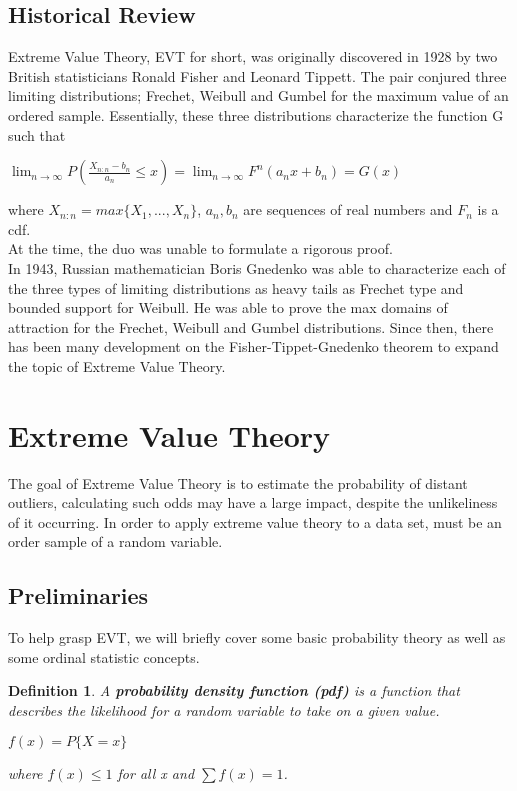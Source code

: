 \documentclass[11pt,a4paper]{article}
\theoremstyle{plain}
\newtheorem{de}[fact]{Definition}
\begin{document}
\subsection{Historical Review}
Extreme Value Theory, EVT for short, was originally discovered in 1928 by two British statisticians Ronald Fisher and Leonard Tippett. The pair conjured three limiting distributions; Frechet, Weibull and Gumbel for the maximum value of an ordered sample. Essentially, these three distributions characterize the function G such that 
\begin{center}
$\lim_{n\rightarrow \infty}P(\frac{X_{n:n}-b_n}{a_n}\leq x)=\lim_{n\rightarrow \infty}F^n(a_nx+b_n)=G(x)$
\end{center}
where $X_{n:n}=max\{X_1,...,X_n \}$, $a_n,b_n$ are sequences of real numbers and $F_n$ is a cdf.
\\
At the time, the duo was unable to formulate a rigorous proof. 
\\
In 1943, Russian mathematician Boris Gnedenko was able to characterize each of the three types of limiting distributions as heavy tails as Frechet type and bounded support for Weibull. He was able to prove the max domains of attraction for the Frechet, Weibull and Gumbel distributions. Since then, there has been many development on the Fisher-Tippet-Gnedenko theorem to expand the topic of Extreme Value Theory. 

\section{Extreme Value Theory}
The goal of Extreme Value Theory is to estimate the probability of distant outliers, calculating such odds may have a large impact, despite the unlikeliness of it occurring. In order to apply extreme value theory to a data set, must be an order sample of a random variable.
\subsection*{Preliminaries}
To help grasp EVT, we will briefly cover some basic probability theory as well as some ordinal statistic concepts.

\newpage
\begin{de}
A \textbf{probability density function (pdf)} is a function that describes the likelihood for a random variable to take on a given value.
\begin{center}
$f(x)=P\{X=x\}$
\end{center}
where $f(x)\leq 1$ for all x and $\sum f(x)=1$.
\end{de}
\end{document}
